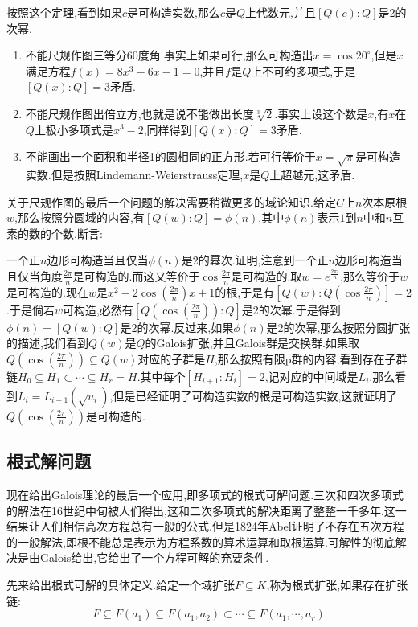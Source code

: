 按照这个定理,看到如果$c$是可构造实数,那么$c$是$Q$上代数元,并且$[Q(c):Q]$是2的次幂.

\begin{enumerate}
	\item 不能尺规作图三等分$60$度角.事实上如果可行,那么可构造出$x=\cos20^\circ$,但是$x$满足方程$f(x)=8x^3-6x-1=0$,并且$f$是$Q$上不可约多项式,于是$[Q(x):Q]=3$矛盾.
	\item 不能尺规作图出倍立方,也就是说不能做出长度$\sqrt[3]{2}$.事实上设这个数是$x$,有$x$在$Q$上极小多项式是$x^3-2$,同样得到$[Q(x):Q]=3$矛盾.
	\item 不能画出一个面积和半径1的圆相同的正方形.若可行等价于$x=\sqrt{\pi}$是可构造实数.但是按照Lindemann-Weierstrauss定理,$x$是$Q$上超越元,这矛盾.
\end{enumerate}

关于尺规作图的最后一个问题的解决需要稍微更多的域论知识.给定$C$上$n$次本原根$w$,那么按照分圆域的内容,有$[Q(w):Q]=\phi(n)$,其中$\phi(n)$表示$1$到$n$中和$n$互素的数的个数.断言:

一个正$n$边形可构造当且仅当$\phi(n)$是2的幂次.证明,注意到一个正$n$边形可构造当且仅当角度$\frac{2\pi}{n}$是可构造的.而这又等价于$\cos\frac{2\pi} {n}$是可构造的.取$w=e^{\frac{2\pi i}{n}}$,那么等价于$w$是可构造的.现在$w$是$x^2-2\cos(\frac{2\pi}{n})x+1$的根,于是有$[Q(w):Q(\cos\frac{2\pi}{n})]=2$.于是倘若$w$可构造,必然有$[Q(\cos(\frac{2\pi}{n})):Q]$是2的次幂.于是得到$\phi(n)= [Q(w):Q]$是2的次幂.反过来,如果$\phi(n)$是2的次幂,那么按照分圆扩张的描述,我们看到$Q(w)$是$Q$的Galois扩张,并且Galois群是交换群.如果取$Q(\cos(\frac{2\pi}{n}))\subseteq Q(w)$对应的子群是$H$,那么按照有限p群的内容,看到存在子群链$H_0\subseteq H_1\subset\cdots\subseteq H_r=H$.其中每个$[H_{i+1}:H_i]=2$,记对应的中间域是$L_i$,那么看到$L_i=L_ {i+1}(\sqrt{u_i})$,但是已经证明了可构造实数的根是可构造实数,这就证明了$Q(\cos(\frac{2\pi}{n}))$是可构造的.
\newpage
\subsection{根式解问题}

现在给出Galois理论的最后一个应用,即多项式的根式可解问题.三次和四次多项式的解法在16世纪中旬被人们得出,这和二次多项式的解决距离了整整一千多年.这一结果让人们相信高次方程总有一般的公式.但是1824年Abel证明了不存在五次方程的一般解法,即根不能总是表示为方程系数的算术运算和取根运算.可解性的彻底解决是由Galois给出,它给出了一个方程可解的充要条件.

先来给出根式可解的具体定义.给定一个域扩张$F\subseteq K$,称为根式扩张,如果存在扩张链:
$$F\subseteq F(a_1)\subseteq F(a_1,a_2)\subset\cdots\subseteq F(a_1,\cdots,a_r)$$

